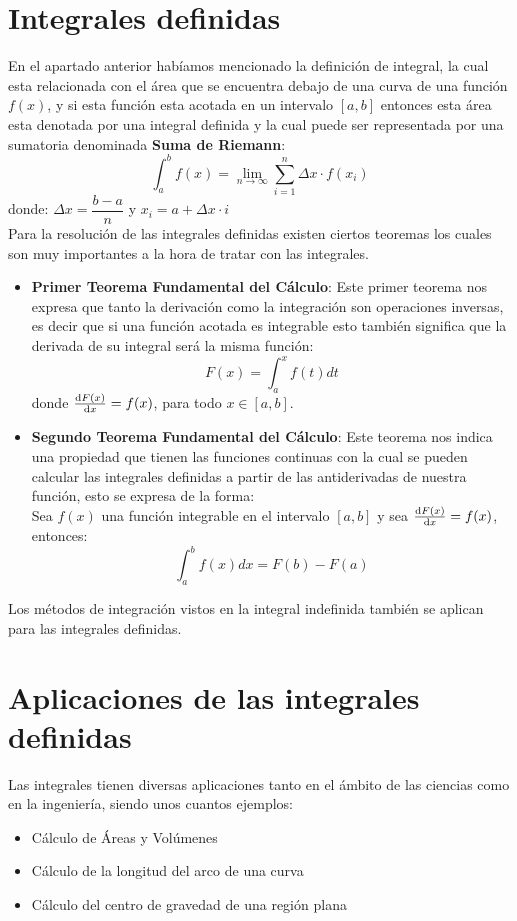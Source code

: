 \documentclass[../main]{subfiles}
\begin{document}
\section{Integrales definidas}
En el apartado anterior habíamos mencionado la definición de integral, la cual esta relacionada con el área que se encuentra debajo de una curva de una función $f(x)$, y si esta función esta acotada en un intervalo $[a,b]$ entonces esta área esta denotada por una integral definida y la cual puede ser representada por una sumatoria denominada \textbf{Suma de Riemann}:
\begin{equation}
    \int_a^b f(x)=\lim_{n \rightarrow \infty} \sum_{i=1}^n \Delta x \cdot f(x_i)
\end{equation}
donde: $\Delta x=\dfrac{b-a}{n}$ y $x_i=a+\Delta x \cdot i$ \\
Para la resolución de las integrales definidas existen ciertos teoremas los cuales son muy importantes a la hora de tratar con las integrales.
\begin{itemize}
    \item \textbf{Primer Teorema Fundamental del Cálculo}: Este primer teorema nos expresa que tanto la derivación como la integración son operaciones inversas, es decir que si una función acotada es integrable esto también significa que la derivada de su integral será la misma función:
        \begin{equation}
            F(x)=\int_a^x f(t)dt
        \end{equation}
    donde $\dv{F(x)}{x}=f(x)$, para todo $x \in [a,b]$.
    \item \textbf{Segundo Teorema Fundamental del Cálculo}: Este teorema nos indica una propiedad que tienen las funciones continuas con la cual se pueden calcular las integrales definidas a partir de las antiderivadas de nuestra función, esto se expresa de la forma: \\
    Sea $f(x)$ una función integrable en el intervalo $[a,b]$ y sea $\dv{F(x)}{x}=f(x)$, entonces:
        \begin{equation}
            \int_a^b f(x)dx=F(b)-F(a)
        \end{equation}
\end{itemize}
Los métodos de integración vistos en la integral indefinida también se aplican para las integrales definidas.
\section{Aplicaciones de las integrales definidas}
Las integrales tienen diversas aplicaciones tanto en el ámbito de las ciencias como en la ingeniería, siendo unos cuantos ejemplos:
\begin{itemize}
    \item Cálculo de Áreas y Volúmenes
    \item Cálculo de la longitud del arco de una curva
    \item Cálculo del centro de gravedad de una región plana
\end{itemize}
\end{document}
